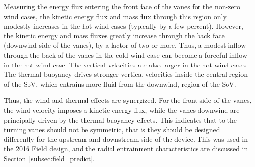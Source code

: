 Measuring the energy flux entering the front face of the vanes for the
non-zero wind cases, the kinetic energy flux and mass flux through this
region only modestly increases in the hot wind cases (typically by a few
percent). However, the kinetic energy and mass fluxes greatly increase
through the back face (downwind side of the vanes), by a factor of two
or more. Thus, a modest inflow through the back of the vanes in the cold
wind case can become a forceful inflow in the hot wind case. The
vertical velocities are also larger in the hot wind cases. The thermal
buoyancy drives stronger vertical velocities inside the central region
of the SoV, which entrains more fluid from the downwind, region of the SoV. 


Thus, the wind and thermal effects are synergized. For the front side of
the vanes, the wind velocity imposes a kinetic energy flux,  
while the vanes downwind are 
principally driven by the thermal buoyancy effects. 
This indicates that to the turning vanes should not be
symmetric, that is they should be designed differently for 
the upstream and downstream side of the device. 
This was used in the 2016 Field design, 
and the radial entrainment characteristics are discussed in Section~\ref{subsec:field_predict}. 

%
% 

